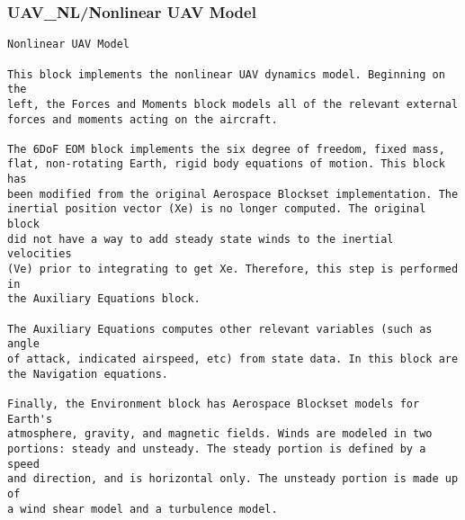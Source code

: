 \documentclass[12pt]{article}
\begin{document}
\subsubsection{UAV\_NL/Nonlinear UAV Model}
\begin{verbatim}
Nonlinear UAV Model

This block implements the nonlinear UAV dynamics model. Beginning on the 
left, the Forces and Moments block models all of the relevant external
forces and moments acting on the aircraft. 

The 6DoF EOM block implements the six degree of freedom, fixed mass,
flat, non-rotating Earth, rigid body equations of motion. This block has
been modified from the original Aerospace Blockset implementation. The
inertial position vector (Xe) is no longer computed. The original block
did not have a way to add steady state winds to the inertial velocities
(Ve) prior to integrating to get Xe. Therefore, this step is performed in
the Auxiliary Equations block.

The Auxiliary Equations computes other relevant variables (such as angle
of attack, indicated airspeed, etc) from state data. In this block are
the Navigation equations.

Finally, the Environment block has Aerospace Blockset models for Earth's
atmosphere, gravity, and magnetic fields. Winds are modeled in two
portions: steady and unsteady. The steady portion is defined by a speed
and direction, and is horizontal only. The unsteady portion is made up of
a wind shear model and a turbulence model.

\end{verbatim}
\end{document}
